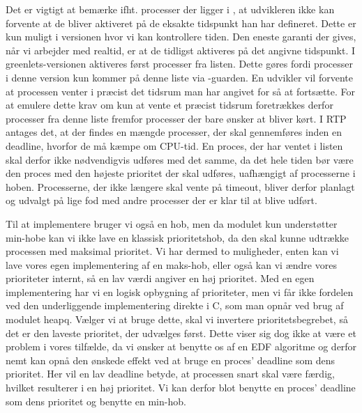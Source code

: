 Det er vigtigt at bemærke ifht. processer der ligger i , at udvikleren ikke kan forvente at de bliver aktiveret på de eksakte tidspunkt han har defineret. Dette er kun muligt i \des versionen hvor vi kan kontrollere tiden. Den eneste garanti der gives, når vi arbejder med realtid, er at de tidligst aktiveres på det angivne tidspunkt. I greenlets-versionen  aktiveres først processer fra  listen. Dette gøres fordi processer i denne version kun kommer på denne liste via -guarden. En udvikler vil forvente  at processen venter i præcist det tidsrum man har angivet for så at fortsætte. For at emulere dette krav om kun at vente et præcist tidsrum foretrækkes derfor processer fra denne liste fremfor processer der bare ønsker at bliver kørt. I RTP antages det, at der findes en mængde processer, der skal gennemføres inden en deadline, hvorfor de må kæmpe om CPU-tid. En proces, der har ventet i  listen skal derfor ikke nødvendigvis udføres med det samme, da det hele tiden bør være den proces med den højeste prioritet der skal udføres, uafhængigt af processerne i  hoben. Processerne, der ikke længere skal vente på timeout, bliver derfor planlagt og udvalgt på lige fod med andre processer der er klar til at blive udført. 

Til at implementere  bruger vi også en hob, men da modulet  kun understøtter min-hobe kan vi ikke lave en klassisk prioritetshob, da den skal kunne udtrække processen med maksimal prioritet. Vi har dermed to muligheder, enten kan vi lave vores egen implementering af en maks-hob, eller også kan vi ændre vores prioriteter internt, så en lav værdi angiver en høj prioritet. Med en egen implementering har vi en  logisk opbygning af prioriteter, men vi får ikke fordelen ved den underliggende implementering  direkte i C, som man opnår ved brug af modulet heapq. Vælger vi at bruge dette, skal vi invertere prioritetsbegrebet, så det er den laveste prioritet, der udvælges først. Dette viser  sig dog ikke at være et problem  i vores tilfælde, da vi ønsker at benytte os af en EDF algoritme og derfor nemt kan opnå den ønskede effekt ved at bruge en proces' deadline som dens prioritet. Her vil en lav deadline betyde, at processen snart skal være færdig, hvilket resulterer i en høj prioritet.
Vi kan derfor blot benytte en proces' deadline som dens prioritet og benytte en min-hob. 


